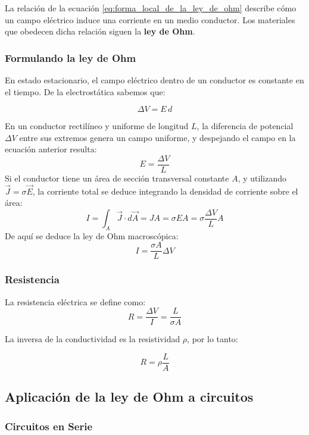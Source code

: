 La relación de la ecuación \ref{eq:forma_local_de_la_ley_de_ohm} describe cómo un campo eléctrico induce una corriente en un medio conductor. Los materiales que obedecen dicha relación siguen la \textbf{ley de Ohm}.

\subsubsection{Formulando la ley de Ohm}

En estado estacionario, el campo eléctrico dentro de un conductor es constante en el tiempo. De la electrostática sabemos que:

\[
\Delta V = E \, d
\]

En un conductor rectilíneo y uniforme de longitud \( L \), la diferencia de potencial \( \Delta V \) entre sus extremos genera un campo uniforme, y despejando el campo en la ecuación anterior resulta:
\[
E = \frac{\Delta V}{L}
\]
Si el conductor tiene un área de sección transversal constante \( A \), y utilizando \( \vec{J} = \sigma \vec{E} \), la corriente total se deduce integrando la densidad de corriente sobre el área:
\[
I = \int_A \vec{J} \cdot d\vec{A} = J A = \sigma E A = \sigma \frac{\Delta V}{L} A
\]
De aquí se deduce la ley de Ohm macroscópica:
\begin{equation}
    \boxed{I = \frac{\sigma A}{L} \Delta V}
    \label{eq:ley_de_ohm}    
\end{equation}

\subsubsection{Resistencia}

La resistencia eléctrica se define como:
\[
R = \frac{\Delta V}{I} = \frac{L}{\sigma A}
\]

La inversa de la conductividad es la resistividad \( \rho \), por lo tanto:

\begin{equation}
    \boxed{R = \rho \frac{L}{A}}
    \label{eq:resistencia}
\end{equation}

\subsection{Aplicación de la ley de Ohm a circuitos}

\subsubsection{Circuitos en Serie}

